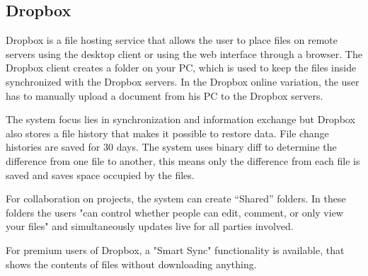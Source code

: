 \subsection{Dropbox}
Dropbox is a file hosting service that allows the user to place files on remote servers using the desktop client or using the web interface through a browser.
The Dropbox client creates a folder on your PC, which is used to keep the files inside synchronized with the Dropbox servers. In the Dropbox online variation, the user has to manually upload a document from his PC to the Dropbox servers.

The system focus lies in synchronization and information exchange but Dropbox also stores a file history that makes it possible to restore data.
File change histories are saved for 30 days.
The system uses binary diff to determine the difference from one file to another, this means only the difference from each file is saved and saves space occupied by the files.\cite{DropboxDiff}

For collaboration on projects, the system can create “Shared” folders. In these folders the users "can control whether people can edit, comment, or only view your files" and simultaneously updates live for all parties involved.\cite{DropboxShared}

For premium users of Dropbox, a "Smart Sync" functionality is available, that shows the contents of files without downloading anything.\cite{DropboxSmartSync}


